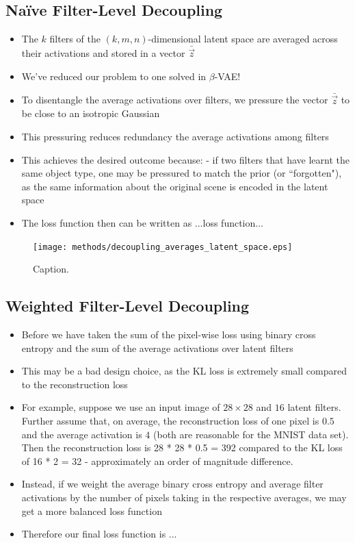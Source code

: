 %
%
\subsection{Na{\"i}ve Filter-Level Decoupling}
\begin{itemize}
\item The $k$ filters of the $(k, m, n)$-dimensional latent space are averaged across their activations and stored in a vector $\bar{\vec{z}}$
\item We've reduced our problem to one solved in $\beta$-VAE!
\item To disentangle the average activations over filters, we pressure the vector $\bar{\vec{z}}$ to be close to an isotropic Gaussian
\item This pressuring reduces redundancy the average activations among filters
\item This achieves the desired outcome because: - if two filters that have learnt the same object type, one may be pressured to match the prior (or ``forgotten"), as the same information about the original scene is encoded in the latent space
\item The loss function then can be written as ...loss function...
\end{itemize}

\begin{figure}[H]
\centering
\captionsetup{justification=centering}
\texttt{[image: methods/decoupling\_averages\_latent\_space.eps]}
\caption{Caption.}
\label{fig:decoupling_averages_latent_space}
\end{figure}

%
%
\subsection{Weighted Filter-Level Decoupling}

\begin{itemize}
\item Before we have taken the sum of the pixel-wise loss using binary cross entropy and the sum of the average activations  over latent filters
\item This may be a bad design choice, as the KL loss is extremely small compared to the reconstruction loss
\item For example, suppose we use an input image of $28 \times 28$ and $16$ latent filters. Further assume that, on average, the reconstruction loss of one pixel is $0.5$ and the average activation is $4$ (both are reasonable for the MNIST data set). Then the reconstruction loss is 28 * 28 * 0.5 = 392 compared to the KL loss of 16 * 2 = 32 - approximately an order of magnitude difference.
\item Instead, if we weight the average binary cross entropy and average filter activations by the number of pixels taking in the respective averages, we may get a more balanced loss function 
\item Therefore our final loss function is ...
\end{itemize}

